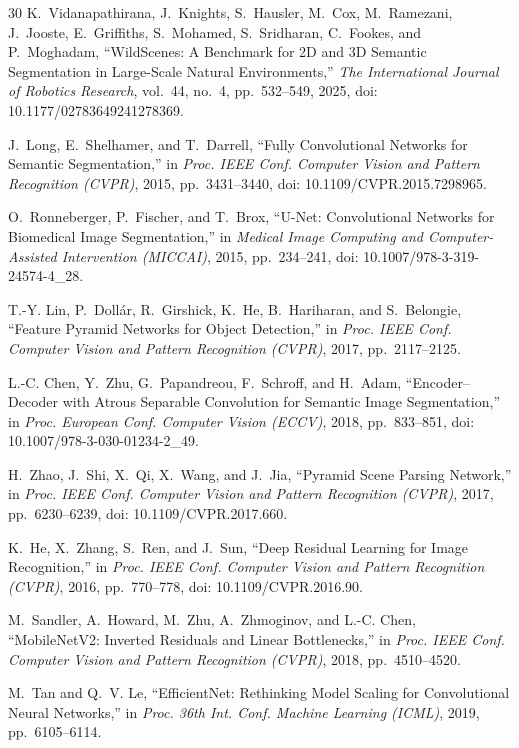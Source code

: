 \begin{thebibliography}{30}
K.~Vidanapathirana, J.~Knights, S.~Hausler, M.~Cox, M.~Ramezani,
J.~Jooste, E.~Griffiths, S.~Mohamed, S.~Sridharan, C.~Fookes, and
P.~Moghadam,
``WildScenes: A Benchmark for 2D and 3D Semantic Segmentation in Large-Scale
Natural Environments,'' \emph{The International Journal of Robotics Research},
vol.~44, no.~4, pp.~532--549, 2025,
doi: 10.1177/02783649241278369.

J.~Long, E.~Shelhamer, and T.~Darrell,
``Fully Convolutional Networks for Semantic Segmentation,''
in \emph{Proc. IEEE Conf. Computer Vision and Pattern Recognition (CVPR)},
2015, pp.~3431--3440, doi: 10.1109/CVPR.2015.7298965.

O.~Ronneberger, P.~Fischer, and T.~Brox,
``U-Net: Convolutional Networks for Biomedical Image Segmentation,''
in \emph{Medical Image Computing and Computer-Assisted Intervention (MICCAI)},
2015, pp.~234--241, doi: 10.1007/978-3-319-24574-4\_28.

T.-Y. Lin, P.~Doll\'{a}r, R.~Girshick, K.~He, B.~Hariharan, and S.~Belongie,
``Feature Pyramid Networks for Object Detection,'' in \emph{Proc. IEEE Conf.
Computer Vision and Pattern Recognition (CVPR)}, 2017, pp.~2117--2125.

L.-C. Chen, Y.~Zhu, G.~Papandreou, F.~Schroff, and H.~Adam,
``Encoder--Decoder with Atrous Separable Convolution for Semantic Image
Segmentation,'' in \emph{Proc. European Conf. Computer Vision (ECCV)}, 2018,
pp.~833--851, doi: 10.1007/978-3-030-01234-2\_49.

H.~Zhao, J.~Shi, X.~Qi, X.~Wang, and J.~Jia,
``Pyramid Scene Parsing Network,'' in \emph{Proc. IEEE Conf. Computer Vision
and Pattern Recognition (CVPR)}, 2017, pp.~6230--6239,
doi: 10.1109/CVPR.2017.660.

K.~He, X.~Zhang, S.~Ren, and J.~Sun,
``Deep Residual Learning for Image Recognition,'' in \emph{Proc. IEEE Conf.
Computer Vision and Pattern Recognition (CVPR)}, 2016, pp.~770--778,
doi: 10.1109/CVPR.2016.90.

M.~Sandler, A.~Howard, M.~Zhu, A.~Zhmoginov, and L.-C. Chen,
``MobileNetV2: Inverted Residuals and Linear Bottlenecks,'' in
\emph{Proc. IEEE Conf. Computer Vision and Pattern Recognition (CVPR)}, 2018,
pp.~4510--4520.

M.~Tan and Q.~V. Le,
``EfficientNet: Rethinking Model Scaling for Convolutional Neural Networks,''
in \emph{Proc. 36th Int. Conf. Machine Learning (ICML)}, 2019,
pp.~6105--6114.


\end{thebibliography}
